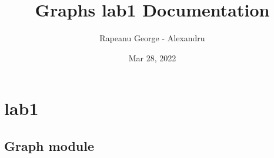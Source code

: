 \documentclass[letterpaper,10pt,english]{sphinxmanual}
\title{Graphs lab1 Documentation}
\date{Mar 28, 2022}
\author{Rapeanu George - Alexandru}
\begin{document}
\pagestyle{empty}
\sphinxmaketitle
\pagestyle{plain}
\sphinxtableofcontents
\pagestyle{normal}
\label{\detokenize{index::doc}}



\chapter{lab1}
\label{\detokenize{modules:lab1}}\label{\detokenize{modules::doc}}

\section{Graph module}
\label{\detokenize{Graph:module-Graph}}\label{\detokenize{Graph:graph-module}}\label{\detokenize{Graph::doc}}
\end{document}
